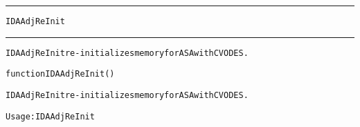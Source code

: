 \begin{samepage}
\hrule
\begin{center}
{\large \verb!IDAAdjReInit!}
\label{p:IDAAdjReInit}
\end{center}
\hrule\vspace{0.1in}



\begin{alltt}
IDAAdjReInit re-initializes memory for ASA with CVODES.
\end{alltt}

\end{samepage}



\begin{samepage}


\begin{alltt}
function IDAAdjReInit() 
\end{alltt}

\end{samepage}



\begin{alltt}
IDAAdjReInit re-initializes memory for ASA with CVODES.

   Usage: IDAAdjReInit
\end{alltt}






\vspace{0.1in}